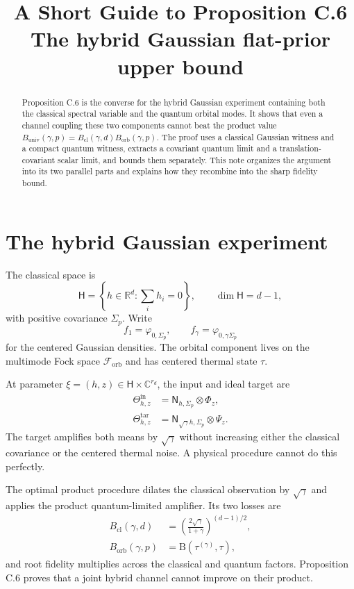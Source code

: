 \documentclass[11pt]{article}
\title{A Short Guide to Proposition C.6\\
\large The hybrid Gaussian flat-prior upper bound}
\author{}
\date{}
\newcommand{\Hc}{\mathsf H}
\newcommand{\F}{\mathcal F_{\mathrm{orb}}}
\newcommand{\B}{\mathrm B}
\newcommand{\Bcl}{B_{\mathrm{cl}}}
\newcommand{\Borb}{B_{\mathrm{orb}}}
\newcommand{\Buniv}{B_{\mathrm{univ}}}
\begin{document}
\maketitle

\begin{abstract}
Proposition C.6 is the converse for the hybrid Gaussian experiment containing
both the classical spectral variable and the quantum orbital modes.  It
shows that even a channel coupling these two components cannot beat the
product value
$\Buniv(\gamma,p)=\Bcl(\gamma,d)\Borb(\gamma,p)$.  The proof uses a
classical Gaussian witness and a compact quantum witness, extracts a
covariant quantum limit and a translation-covariant scalar limit, and bounds
them separately.  This note organizes the argument into its two parallel
parts and explains how they recombine into the sharp fidelity bound.
\end{abstract}

\section{The hybrid Gaussian experiment}

The classical space is
\[
  \Hc=\left\{h\in\mathbb R^d:\sum_i h_i=0\right\},
  \qquad \dim\Hc=d-1,
\]
with positive covariance $\Sigma_p$.  Write
\[
  f_1=\varphi_{0,\Sigma_p},
  \qquad
  f_\gamma=\varphi_{0,\gamma\Sigma_p}
\]
for the centered Gaussian densities.  The orbital component lives on the
multimode Fock space $\F$ and has centered thermal state $\tau$.

At parameter $\xi=(h,z)\in\Hc\times\mathbb C^{r_d}$, the input and ideal
target are
\begin{align*}
  \Theta_{h,z}^{\mathrm{in}}
  &=\mathsf N_{h,\Sigma_p}\otimes\Phi_z,\\
  \Theta_{h,z}^{\mathrm{tar}}
  &=\mathsf N_{\sqrt\gamma h,\Sigma_p}\otimes\Psi_z.
\end{align*}
The target amplifies both means by $\sqrt\gamma$ without increasing either
the classical covariance or the centered thermal noise.  A physical
procedure cannot do this perfectly.

The optimal product procedure dilates the classical observation by
$\sqrt\gamma$ and applies the product quantum-limited amplifier.  Its two
losses are
\begin{align}
  \Bcl(\gamma,d)
  &=\left(\frac{2\sqrt\gamma}{1+\gamma}\right)^{(d-1)/2},
  \label{eq:Bcl}\\
  \Borb(\gamma,p)
  &=\B(\tau^{(\gamma)},\tau),
  \label{eq:Borb}
\end{align}
and root fidelity multiplies across the classical and quantum factors.
Proposition C.6 proves that a joint hybrid channel cannot improve on their
product.
\end{document}
